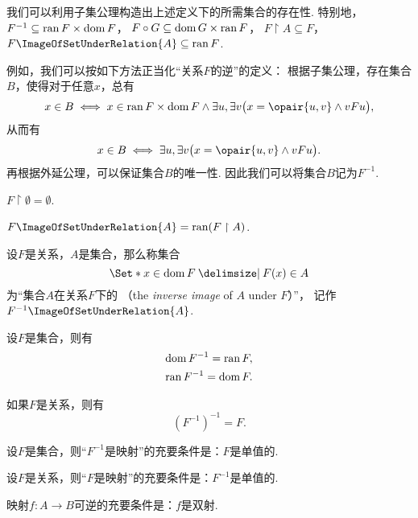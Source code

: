 我们可以利用子集公理构造出上述定义下的所需集合的存在性.
特别地，
\(F^{-1} \subseteq \operatorname{ran} F \times \operatorname{dom} F\)，
\(F \circ G \subseteq \operatorname{dom} G \times \operatorname{ran} F\)，
\(F \upharpoonright A \subseteq F\)，
\(F\ImageOfSetUnderRelation{A} \subseteq \ran F\).

例如，我们可以按如下方法正当化“关系\(F\)的逆”的定义：
根据子集公理，存在集合\(B\)，使得对于任意\(x\)，总有\[
	x \in B \iff
	x \in \ran F \times \dom F
	\land
	\exists u, \exists v \bigl( x = \opair{u,v} \land v F u \bigr),
\]
从而有\[
	x \in B \iff
	\exists u, \exists v \bigl( x = \opair{u,v} \land v F u \bigr).
\]
再根据外延公理，可以保证集合\(B\)的唯一性.
因此我们可以将集合\(B\)记为\(F^{-1}\).

\begin{theorem}
\(F \upharpoonright \emptyset = \emptyset\).
\end{theorem}

\begin{theorem}
\(F\ImageOfSetUnderRelation{A} = \ran(F \upharpoonright A)\).
\end{theorem}

\begin{definition}
设\(F\)是关系，\(A\)是集合，那么称集合\[
	\Set*{ x \in \dom F \given F(x) \in A }
\]为“集合\(A\)在关系\(F\)下的%
（the \emph{inverse image} of \(A\) under \(F\)）”，
记作\(F^{-1}\ImageOfSetUnderRelation{A}\).
\end{definition}

\begin{theorem}
设\(F\)是集合，则有\begin{gather}
	\operatorname{dom} F^{-1} = \operatorname{ran} F, \\
	\operatorname{ran} F^{-1} = \operatorname{dom} F.
\end{gather}

如果\(F\)是关系，则有\begin{equation}
	(F^{-1})^{-1} = F.
\end{equation}
\end{theorem}

\begin{theorem}
设\(F\)是集合，则“\(F^{-1}\)是映射”的充要条件是：\(F\)是单值的.

设\(F\)是关系，则“\(F\)是映射”的充要条件是：\(F^{-1}\)是单值的.
\end{theorem}

\begin{theorem}\label{theorem:集合论.映射可逆的充要条件}
映射\(f\colon A \to B\)可逆的充要条件是：\(f\)是双射.
\end{theorem}

